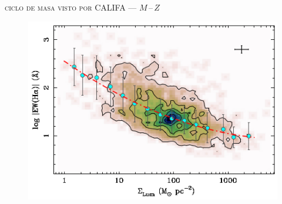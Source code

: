 \documentclass[xcolor=dvipsnames,fleqn,hyperref={colorlinks,citecolor=black,linkcolor=black,urlcolor=black}]{beamer}
\begin{document}
\begin{frame}{\textsc{ciclo de masa visto por CALIFA --- $M\,$--$\,Z$}}

\begin{figure}
\includegraphics[scale=1]{img/rosales-ortega2012-3}
\end{figure}
\end{frame}
\end{document}
